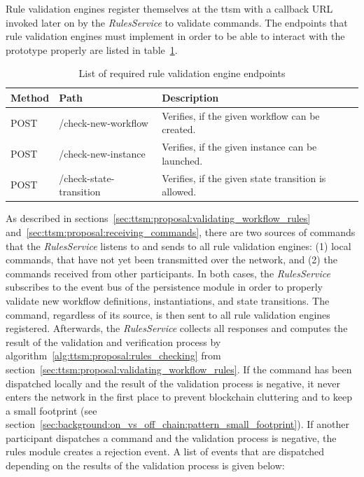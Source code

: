 Rule validation engines register themselves at the \gls{ttsm} with a callback URL invoked later on by the \textit{RulesService} to validate commands. The endpoints that rule validation engines must implement in order to be able to interact with the prototype properly are listed in table~\ref{tab:ttsm:prototype:rule_engine_endpoints}.

\begin{table}[h]
\centering
\begin{tabular}{|l|l|l|}
    \hline
    \textbf{Method} & \textbf{Path} & \textbf{Description}\\
    \hline
    POST & /check-new-workflow & Verifies, if the given workflow can be created.\\
    POST & /check-new-instance & Verifies, if the given instance can be launched.\\
    POST & /check-state-transition & Verifies, if the given state transition is allowed.\\
    \hline
\end{tabular}
\caption{List of required rule validation engine endpoints}
\label{tab:ttsm:prototype:rule_engine_endpoints}
\end{table}

As described in sections~\ref{sec:ttsm:proposal:validating_workflow_rules} and~\ref{sec:ttsm:proposal:receiving_commands}, there are two sources of commands that the \textit{RulesService} listens to and sends to all rule validation engines: (1) local commands, that have not yet been transmitted over the network, and (2) the commands received from other participants. In both cases, the \textit{RulesService} subscribes to the event bus of the persistence module in order to properly validate new workflow definitions, instantiations, and state transitions. The command, regardless of its source, is then sent to all rule validation engines registered. Afterwards, the \textit{RulesService} collects all responses and computes the result of the validation and verification process by algorithm~\ref{alg:ttsm:proposal:rules_checking} from section~\ref{sec:ttsm:proposal:validating_workflow_rules}. If the command has been dispatched locally and the result of the validation process is negative, it never enters the network in the first place to prevent blockchain cluttering and to keep a small footprint (see section~\ref{sec:background:on_vs_off_chain:pattern_small_footprint}). If another participant dispatches a command and the validation process is negative, the rules module creates a rejection event. A list of events that are dispatched depending on the results of the validation process is given below:

